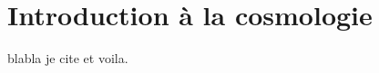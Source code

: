 \documentclass[11pt, twoside, a4paper, openright]{report}
\begin{document}
\graphicspath{ {../figures/intro/} }

\chapter{Introduction à la cosmologie}
\minitoc
\newpage
\thispagestyle{fancy}


blabla je cite \textcite{Laurent2016} et voila.

\printbibliography
\end{document}
